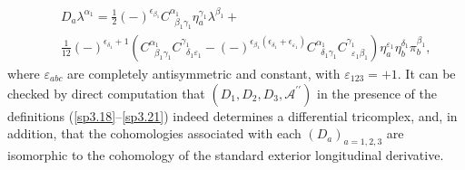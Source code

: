 \documentclass[a4paper,12pt]{article}
\begin{document}
\begin{eqnarray}
&&D_{a}\lambda ^{\alpha _{1}}=\frac{1}{2}\left( -\right) ^{\epsilon _{\beta
_{1}}}C_{\;\;\beta _{1}\gamma _{1}}^{\alpha _{1}}\eta _{a}^{\gamma
_{1}}\lambda ^{\beta _{1}}+  \nonumber \\
&&\frac{1}{12}\left( -\right) ^{\epsilon _{\delta _{1}}+1}\left(
C_{\;\;\beta _{1}\gamma _{1}}^{\alpha _{1}}C_{\;\;\delta _{1}\varepsilon
_{1}}^{\gamma _{1}}-\left( -\right) ^{\epsilon _{\beta _{1}}\left( \epsilon
_{\delta _{1}}+\epsilon _{\varepsilon _{1}}\right) }C_{\;\;\delta _{1}\gamma
_{1}}^{\alpha _{1}}C_{\;\;\varepsilon _{1}\beta _{1}}^{\gamma _{1}}\right)
\eta _{a}^{\varepsilon _{1}}\eta _{b}^{\delta _{1}}\pi _{b}^{\beta _{1}},
\label{sp3.21}
\end{eqnarray}
where $\varepsilon _{abc}$ are completely antisymmetric and constant, with $%
\varepsilon _{123}=+1$. It can be checked by direct computation that $\left(
D_{1},D_{2},D_{3},\mathcal{A}^{\prime \prime }\right) $ in the presence of
the definitions (\ref{sp3.18}--\ref{sp3.21}) indeed determines a
differential tricomplex, and, in addition, that the cohomologies associated
with each $\left( D_{a}\right) _{a=1,2,3}$ are isomorphic to the cohomology
of the standard exterior longitudinal derivative.
\end{document}
